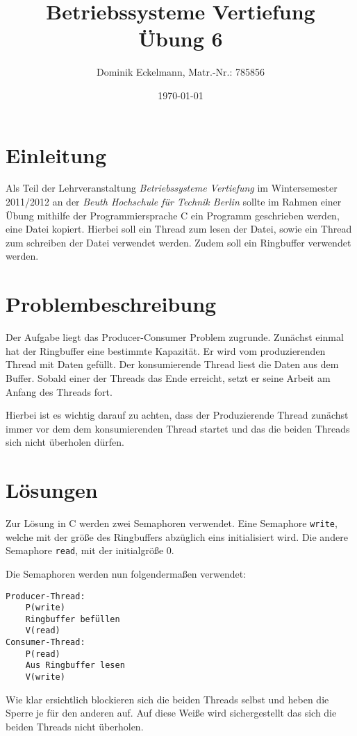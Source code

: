 \documentclass[a4paper]{article}
\title{Betriebssysteme Vertiefung \\ Übung 6}
\author{Dominik Eckelmann, Matr.-Nr.: 785856}
\date{\today}
\begin{document}
\maketitle

\tableofcontents

\section{Einleitung}
Als Teil der Lehrveranstaltung \textit{Betriebssysteme Vertiefung} im Wintersemester 2011/2012 an der \textit{Beuth Hochschule für Technik Berlin} sollte im Rahmen einer Übung mithilfe der Programmiersprache C ein Programm geschrieben werden, eine Datei kopiert. Hierbei soll ein Thread zum lesen der Datei, sowie ein Thread zum schreiben der Datei verwendet werden. Zudem soll ein Ringbuffer verwendet werden.

\section{Problembeschreibung}
Der Aufgabe liegt das Producer-Consumer Problem zugrunde.
Zunächst einmal hat der Ringbuffer eine bestimmte Kapazität.
Er wird vom produzierenden Thread mit Daten gefüllt.
Der konsumierende Thread liest die Daten aus dem Buffer.
Sobald einer der Threads das Ende erreicht, setzt er seine Arbeit
am Anfang des Threads fort.

Hierbei ist es wichtig darauf zu achten, dass der Produzierende Thread zunächst
immer vor dem dem konsumierenden Thread startet und das die beiden Threads sich nicht
überholen dürfen.

\section{Lösungen}

Zur Lösung in C werden zwei Semaphoren verwendet. 
Eine Semaphore \texttt{write}, welche mit der größe des Ringbuffers abzüglich eins initialisiert wird. Die andere Semaphore \texttt{read}, mit der initialgröße 0.

Die Semaphoren werden nun folgendermaßen verwendet:
\begin{verbatim}
Producer-Thread:
    P(write)
    Ringbuffer befüllen
    V(read)
Consumer-Thread:
    P(read)
    Aus Ringbuffer lesen
    V(write)
\end{verbatim}

Wie klar ersichtlich blockieren sich die beiden Threads selbst und heben die Sperre je für den
anderen auf. Auf diese Weiße wird sichergestellt das sich die beiden Threads nicht überholen.
\end{document}
